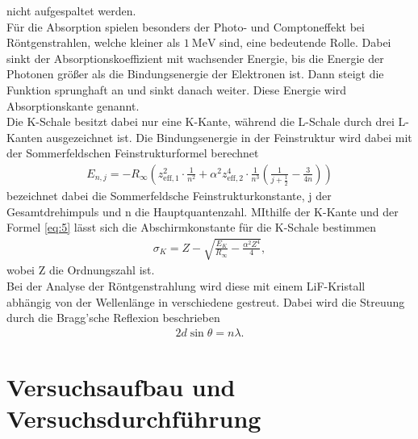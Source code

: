 nicht aufgespaltet werden.\\
Für die Absorption spielen besonders der Photo- und Comptoneffekt bei Röntgenstrahlen, welche kleiner
als $\SI{1}{\mega\electronvolt} $ sind, eine bedeutende Rolle. 
Dabei sinkt der Absorptionskoeffizient mit wachsender Energie, bis die Energie der Photonen
größer als die Bindungsenergie der Elektronen ist. Dann steigt die Funktion sprunghaft an und sinkt danach weiter.
Diese Energie wird Absorptionskante genannt.\\
Die K-Schale besitzt dabei nur eine K-Kante, während die L-Schale durch drei L-Kanten ausgezeichnet ist.
Die Bindungsenergie in der Feinstruktur wird dabei mit der Sommerfeldschen Feinstrukturformel berechnet \cite{V602}
\begin{align}
    E_{n,j}= - R_{\infty} \left(z_{\text{eff},1}^2\cdot \frac{1}{n^2}+\alpha ^2 z_{\text{eff},2}^4\cdot \frac{1}{n^3}\left(\frac{1}{j+\frac{1}{2}}-\frac{3}{4n} \right) \right) \label{eq:5}
\end{align}
\alpha bezeichnet dabei die Sommerfeldsche Feinstrukturkonstante, j der Gesamtdrehimpuls und n 
die Hauptquantenzahl.
MIthilfe der K-Kante und der Formel \eqref{eq:5} lässt sich die Abschirmkonstante für die
K-Schale bestimmen \cite{V602}
\begin{align}
    \sigma _K = Z-\sqrt{\frac{E_K}{R_{\infty}}-\frac{\alpha^2Z^4}{4}} \label{eq:6},
\end{align}
wobei Z die Ordnungszahl ist.\\
Bei der Analyse der Röntgenstrahlung wird diese mit einem LiF-Kristall abhängig von der Wellenlänge in verschiedene
gestreut. Dabei wird die Streuung durch die Bragg'sche Reflexion beschrieben
\begin{align}
    2d \sin \theta =n \lambda \label{eq:7}.
\end{align}


\section{Versuchsaufbau und Versuchsdurchführung}\justifying

